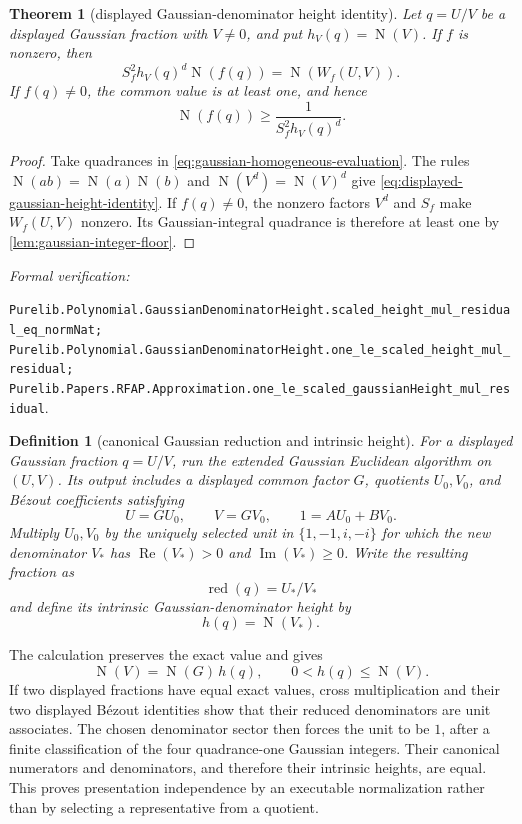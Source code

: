 \documentclass[11pt]{article}
\newtheorem{theorem}{Theorem}[section]
\newtheorem{definition}[definition]{Definition}
\newcommand{\Norm}[1]{\operatorname{N}\!\left(#1\right)}
\newcommand{\Ree}{\operatorname{Re}}
\newcommand{\Imm}{\operatorname{Im}}
\newcommand{\leanref}[1]{\par\smallskip\noindent
  \emph{Formal verification:}\par\nobreak
  {\raggedright\nolinkurl{#1}.\par}}
\begin{document}
\begin{theorem}[displayed Gaussian-denominator height identity]
\label{thm:displayed-gaussian-height-lower}
Let $q=U/V$ be a displayed Gaussian fraction with $V\ne0$, and put
$h_V(q)=\Norm V$.  If $f$ is nonzero, then
\begin{equation}
\label{eq:displayed-gaussian-height-identity}
 S_f^2h_V(q)^d\Norm{f(q)}=\Norm{W_f(U,V)}.
\end{equation}
If $f(q)\ne0$, the common value is at least one, and hence
\begin{equation}
\label{eq:displayed-gaussian-height-lower}
                         \Norm{f(q)}\ge
                         \frac1{S_f^2h_V(q)^d}.
\end{equation}
\end{theorem}

\begin{proof}
Take quadrances in \eqref{eq:gaussian-homogeneous-evaluation}.  The rules
$\Norm{ab}=\Norm a\Norm b$ and $\Norm{V^d}=\Norm V^d$ give
\eqref{eq:displayed-gaussian-height-identity}.  If $f(q)\ne0$, the nonzero factors
$V^d$ and $S_f$ make $W_f(U,V)$ nonzero.  Its Gaussian-integral quadrance is
therefore at least one by \cref{lem:gaussian-integer-floor}.
\end{proof}

\leanref{Purelib.Polynomial.GaussianDenominatorHeight.scaled_height_mul_residual_eq_normNat;
Purelib.Polynomial.GaussianDenominatorHeight.one_le_scaled_height_mul_residual;
Purelib.Papers.RFAP.Approximation.one_le_scaled_gaussianHeight_mul_residual}

\begin{definition}[canonical Gaussian reduction and intrinsic height]
\label{def:intrinsic-gaussian-height}
For a displayed Gaussian fraction $q=U/V$, run the extended Gaussian
Euclidean algorithm on $(U,V)$.  Its output includes a displayed common
factor $G$, quotients $U_0,V_0$, and B\'ezout coefficients satisfying
\[
 U=GU_0,\qquad V=GV_0,\qquad 1=A U_0+B V_0.
\]
Multiply $U_0,V_0$ by the uniquely selected unit in
$\{1,-1,i,-i\}$ for which the new denominator $V_*$ has
$\Ree(V_*)>0$ and $\Imm(V_*)\ge0$.  Write the resulting fraction as
\[
                 \operatorname{red}(q)=U_*/V_*
\]
and define its \emph{intrinsic Gaussian-denominator height} by
\[
                              h(q)=\Norm{V_*}.
\]
\end{definition}

The calculation preserves the exact value and gives
\[
       \Norm V=\Norm G\,h(q),\qquad 0<h(q)\le\Norm V.
\]
If two displayed fractions have equal exact values, cross multiplication and
their two displayed B\'ezout identities show that their reduced denominators
are unit associates.  The chosen denominator sector then forces the unit to
be $1$, after a finite classification of the four quadrance-one Gaussian
integers.  Their canonical numerators and denominators, and therefore their
intrinsic heights, are equal.  This proves presentation independence by an
executable normalization rather than by selecting a representative from a
quotient.
\end{document}
